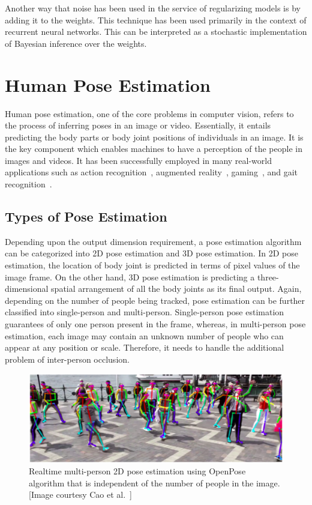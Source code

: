 Another way that noise has been used in the service of regularizing models is by adding it to the weights. This technique has been used primarily in the context of recurrent neural networks. This can be interpreted as a stochastic implementation of Bayesian inference over the weights.


\section{Human Pose Estimation}
Human pose estimation, one of the core problems in computer vision, refers to the process of inferring poses in an image or video. Essentially, it entails predicting the body parts or body joint positions of individuals in an image.
It is the key component which enables machines to have a perception of the people in images and videos. It has been successfully employed in many real-world applications such as action recognition~\cite{Song_17}, augmented reality~\cite{Marchand_16}, gaming~\cite{Ke_10}, and gait recognition~\cite{Liao_19}. 


\subsection{Types of Pose Estimation} 
Depending upon the output dimension requirement, a pose estimation algorithm can be categorized into 2D pose estimation and 3D pose estimation. In 2D pose estimation, the location of body joint is predicted in terms of pixel values of the image frame. On the other hand, 3D pose estimation is predicting a three-dimensional spatial arrangement of all the body joints as its final output. Again, depending on the number of people being tracked, pose estimation can be further classified into single-person and multi-person. Single-person pose estimation guarantees of only one person present in the frame, whereas, in multi-person pose estimation, each image may contain an unknown number of people who can appear at any position or scale. Therefore, it needs to handle the additional problem of inter-person occlusion. 

\begin{figure}[t]
	\centering
	\includegraphics[width=\textwidth]{figures/openpose_demo.eps}
	\caption[Realtime multi-person 2D pose estimation using OpenPose algorithm]
	{Realtime multi-person 2D pose estimation using OpenPose algorithm that is independent of the number of people in the image. [Image courtesy Cao et al.~\cite{Cao_19}] \label{fig:openpose_demo}}
\end{figure}

